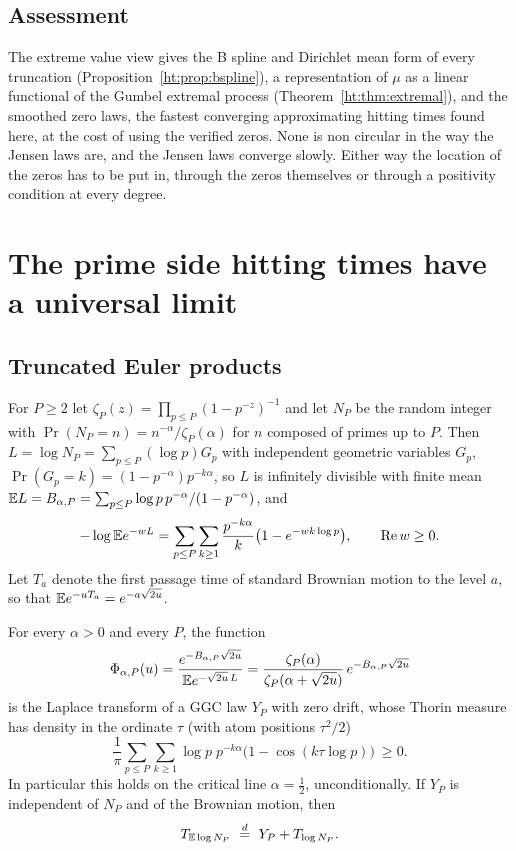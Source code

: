 \subsection{Assessment}
The extreme value view gives the B spline and Dirichlet mean form of every truncation (Proposition~\ref{ht:prop:bspline}), a representation of $\mu$ as a linear functional of the Gumbel extremal process (Theorem~\ref{ht:thm:extremal}), and the smoothed zero laws, the fastest converging approximating hitting times found here, at the cost of using the verified zeros. None is non circular in the way the Jensen laws are, and the Jensen laws converge slowly. Either way the location of the zeros has to be put in, through the zeros themselves or through a positivity condition at every degree.

\section{The prime side hitting times have a universal limit}\label{ht:sec:prime}

\subsection{Truncated Euler products}

For $P\ge2$ let $\zeta_P(z)=\prod_{p\le P}(1-p^{-z})^{-1}$ and let $N_P$ be the random integer with $\Pr(N_P=n)=n^{-\alpha}/\zeta_P(\alpha)$ for $n$ composed of primes up to $P$. Then $L=\log N_P=\sum_{p\le P}(\log p)G_p$ with independent geometric variables $G_p$, $\Pr(G_p=k)=(1-p^{-\alpha})p^{-k\alpha}$, so $L$ is infinitely divisible with finite mean $\mathbb{E} L=B_{\alpha,P}=\sum_{p\le P}\log p\,p^{-\alpha}/(1-p^{-\alpha})$, and
\[
-\log\mathbb{E} e^{-wL}=\sum_{p\le P}\sum_{k\ge1}\frac{p^{-k\alpha}}k\big(1-e^{-wk\log p}\big),\qquad\operatorname{Re} w\ge0.
\]
Let $T_a$ denote the first passage time of standard Brownian motion to the level $a$, so that $\mathbb{E} e^{-uT_a}=e^{-a\sqrt{2u}}$.

\begin{proposition}\label{ht:thm:trunc}
For every $\alpha>0$ and every $P$, the function
\[
\Phi_{\alpha,P}(u)=\frac{e^{-B_{\alpha,P}\sqrt{2u}}}{\mathbb{E} e^{-\sqrt{2u}\,L}}=\frac{\zeta_P(\alpha)}{\zeta_P(\alpha+\sqrt{2u})}\,e^{-B_{\alpha,P}\sqrt{2u}}
\]
is the Laplace transform of a GGC law $Y_P$ with zero drift, whose Thorin measure has density in the ordinate $\tau$ (with atom positions $\tau^2/2$)
\[
\frac1\pi\sum_{p\le P}\sum_{k\ge1}\log p\;p^{-k\alpha}\big(1-\cos(k\tau\log p)\big)\ \ge0 .
\]
In particular this holds on the critical line $\alpha=\frac12$, unconditionally. If $Y_P$ is independent of $N_P$ and of the Brownian motion, then
\[
T_{\mathbb{E}\log N_P}\ \overset{d}{=}\ Y_P+T_{\log N_P}.
\]
\end{proposition}

